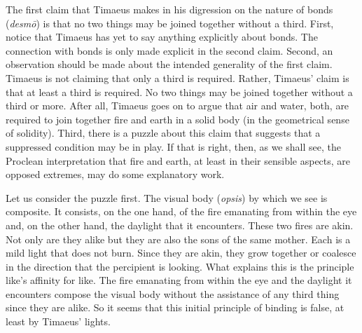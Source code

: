 The first claim that Timaeus makes in his digression on the nature of bonds (\emph{desmō}) is that no two things may be joined together without a third. First, notice that Timaeus has yet to say anything explicitly about bonds. The connection with bonds is only made explicit in the second claim. Second, an observation should be made about the intended generality of the first claim. Timaeus is not claiming that only a third is required. Rather, Timaeus' claim is that at least a third is required. No two things may be joined together without a third or more. After all, Timaeus goes on to argue that air and water, both, are required to join together fire and earth in a solid body (in the geometrical sense of solidity). Third, there is a puzzle about this claim that suggests that a suppressed condition may be in play. If that is right, then, as we shall see, the Proclean interpretation that fire and earth, at least in their sensible aspects, are opposed extremes, may do some explanatory work.

Let us consider the puzzle first. The visual body (\emph{opsis}) by which we see is composite. It consists, on the one hand, of the fire emanating from within the eye and, on the other hand, the daylight that it encounters. These two fires are akin. Not only are they alike but they are also the sons of the same mother. Each is a mild light that does not burn. Since they are akin, they grow together or coalesce in the direction that the percipient is looking. What explains this is the principle like's affinity for like. The fire emanating from within the eye and the daylight it encounters compose the visual body without the assistance of any third thing since they are alike. So it seems that this initial principle of binding is false, at least by Timaeus' lights.

